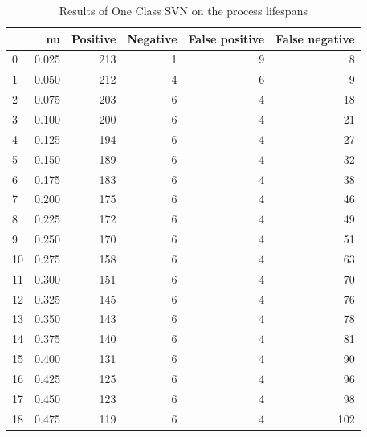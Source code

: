 \documentclass[a4paper,twoside,12pt]{book}
\begin{document}
\begin{appendices}

\begin{table}
	\centering
	\caption{Results of One Class SVN on the process lifespans}
	\label{id:tab:OCSVNlifespans}
	\begin{tabular}{lrrrrr}
		\toprule
		{} &     nu &  Positive &  Negative &  False positive &  False negative \\
		\midrule
		0  &  0.025 &       213 &         1 &               9 &               8 \\
		1  &  0.050 &       212 &         4 &               6 &               9 \\
		2  &  0.075 &       203 &         6 &               4 &              18 \\
		3  &  0.100 &       200 &         6 &               4 &              21 \\
		4  &  0.125 &       194 &         6 &               4 &              27 \\
		5  &  0.150 &       189 &         6 &               4 &              32 \\
		6  &  0.175 &       183 &         6 &               4 &              38 \\
		7  &  0.200 &       175 &         6 &               4 &              46 \\
		8  &  0.225 &       172 &         6 &               4 &              49 \\
		9  &  0.250 &       170 &         6 &               4 &              51 \\
		10 &  0.275 &       158 &         6 &               4 &              63 \\
		11 &  0.300 &       151 &         6 &               4 &              70 \\
		12 &  0.325 &       145 &         6 &               4 &              76 \\
		13 &  0.350 &       143 &         6 &               4 &              78 \\
		14 &  0.375 &       140 &         6 &               4 &              81 \\
		15 &  0.400 &       131 &         6 &               4 &              90 \\
		16 &  0.425 &       125 &         6 &               4 &              96 \\
		17 &  0.450 &       123 &         6 &               4 &              98 \\
		18 &  0.475 &       119 &         6 &               4 &             102 \\

\end{tabular}
\end{table}
\end{appendices}
\end{document}
